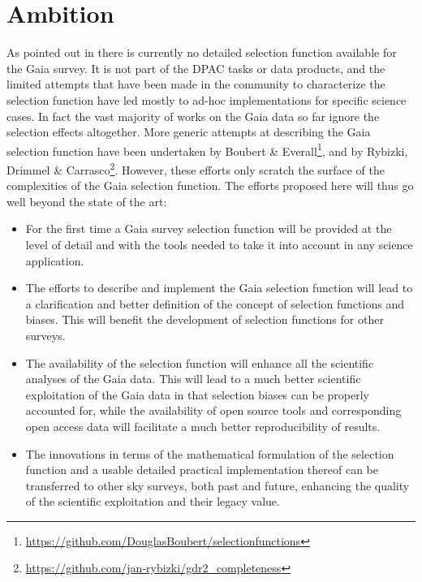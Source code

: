 \section{Ambition}
\label{sec:ambition}

As pointed out in  there is currently no detailed selection function available for the Gaia survey. It is not part of the DPAC tasks or data products, and the limited attempts that have been made in the community to characterize the selection function have led mostly to ad-hoc implementations for specific science cases. In fact the vast majority of works on the Gaia data so far ignore the selection effects altogether. More generic attempts at describing the Gaia selection function have been undertaken by Boubert \& Everall\footnote{\url{https://github.com/DouglasBoubert/selectionfunctions}}, and by Rybizki, Drimmel \& Carrasco\footnote{\url{https://github.com/jan-rybizki/gdr2_completeness}}. However, these efforts only scratch the surface of the complexities of the Gaia selection function. The efforts proposed here will thus go well beyond the state of the art:
\begin{itemize}
    \item For the first time a Gaia survey selection function will be provided at the level of detail and with the tools needed to take it into account in any science application.
    \item The efforts to describe and implement the Gaia selection function will lead to a clarification and better definition of the concept of selection functions and biases. This will benefit the development of selection functions for other surveys.
    \item The availability of the selection function will enhance all the scientific analyses of the Gaia data. This will lead to a much better scientific exploitation of the Gaia data in that selection biases can be properly accounted for, while the availability of open source tools and corresponding open access data will facilitate a much better reproducibility of results.
    \item The innovations in terms of the mathematical formulation of the selection function and a usable detailed practical implementation thereof can be transferred to other sky surveys, both past and future, enhancing the quality of the scientific exploitation and their legacy value.
\end{itemize}

